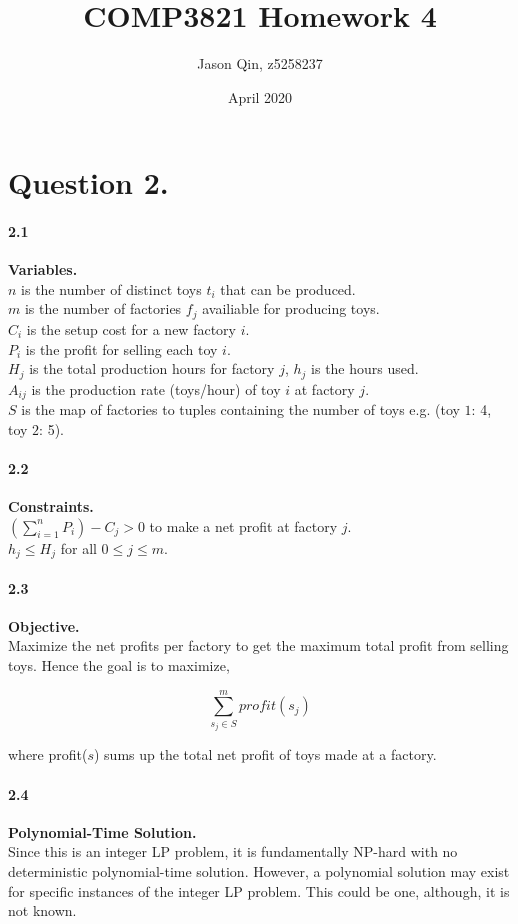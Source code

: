 \documentclass{article}
\title{COMP3821 Homework 4}
\author{Jason Qin, z5258237}
\date{April 2020}
\begin{document}
\maketitle

\section*{Question 2.}
\paragraph{2.1} \textbf{Variables.} \\

\noindent
$n$ is the number of distinct toys $t_i$ that can be produced. \\
$m$ is the number of factories $f_j$ availiable for producing toys. \\
$C_i$ is the setup cost for a new factory $i$. \\
$P_i$ is the profit for selling each toy $i$. \\
$H_j$ is the total production hours for factory $j$, $h_j$ is the hours used. \\
$A_{ij}$ is the production rate (toys/hour) of toy $i$ at factory $j$. \\
$S$ is the map of factories to tuples containing the number of toys e.g. (toy $1$: 4, toy $2$: 5).

\paragraph*{2.2} \textbf{Constraints.} \\

\noindent
$(\sum_{i=1}^{n}P_i) - C_j > 0$ to make a net profit at factory $j$. \\
$h_j \leq H_j$ for all $0 \leq j \leq m$.

\paragraph*{2.3} \textbf{Objective.} \\

\noindent
Maximize the net profits per factory to get the maximum total profit from selling toys.
Hence the goal is to maximize,

$$\sum_{s_j \in S}^{m} profit(s_j)$$

where profit($s$) sums up
the total net profit of toys made at a factory.

\paragraph*{2.4} \textbf{Polynomial-Time Solution.} \\

\noindent
Since this is an integer LP problem, it is fundamentally NP-hard with no deterministic polynomial-time solution.
However, a polynomial solution may exist for specific instances of the integer LP problem. This could be one, although, it is not known.
\end{document}
